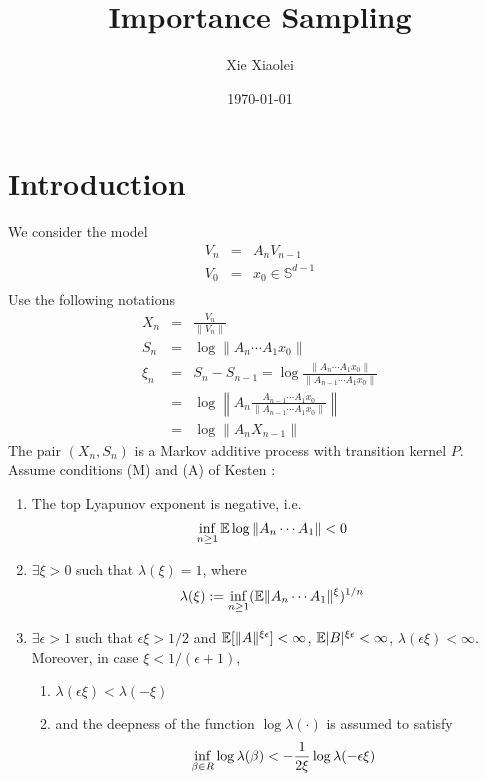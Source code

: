 \documentclass{article}
\title{Importance Sampling}
\author{Xie Xiaolei}
\date{\today}
\begin{document}
\maketitle
\section{Introduction}
We consider the model
\begin{eqnarray*}
V_n &=& A_n V_{n-1} \\
V_0 &=& x_0 \in \mathbb S^{d-1}\\
\end{eqnarray*}
Use the following notations
\begin{eqnarray*}
X_n &=& \frac{V_n}{\|V_n\|} \\
S_n &=& \log \|A_n \cdots A_1 x_0\| \\
\xi_n &=& S_n - S_{n-1} = \log\frac{\|A_n \cdots A_1 x_0\|}{\|A_{n-1}
  \cdots A_1 x_0\|} \\
&=& \log\left\| A_n \frac{A_{n-1} \cdots A_1 x_0}{\|A_{n-1} \cdots A_1
    x_0\|} \right\|\\
&=& \log \|A_n X_{n-1}\|
\end{eqnarray*}
The pair $(X_n, S_n)$ is a Markov additive process with transition
kernel $P$. Assume conditions (M) and (A) of Kesten \cite{Kesten1973}:
\begin{enumerate}
\item The top Lyapunov exponent is negative, i.e.
  \begin{equation}
    \label{eq:neg_top_Lyapunov}
    \inf_{n \geq 1} \mathbb{E} \log \|A_n \cdots A_1\| < 0    
  \end{equation}
\item $\exists \xi > 0$ such that $\lambda(\xi) = 1$, where
  $$
  \lambda(\xi) := \inf_{n \geq 1} (\mathbb{E} \|A_n \cdots A_1\|^\xi)^{1/n}
  $$
\item $\exists \epsilon > 1$ such that $\epsilon \xi > 1/2$ and
  $\mathbb{E}[\|A\|^{\xi\epsilon}] < \infty$, $\mathbb{E} |B|^{\xi \epsilon} <
  \infty$, $\lambda(\epsilon \xi) < \infty$. Moreover, in case $\xi <
  1/(\epsilon + 1)$,
  \begin{enumerate}
  \item $\lambda(\epsilon \xi) < \lambda(-\xi)$
  \item and the deepness of the function $\log \lambda(\cdot)$ is
    assumed to satisfy
    \begin{equation}
      \label{eq:deepness}
      \inf_{\beta \in R} \log \lambda(\beta) < - {1 \over 2\xi} \log
      \lambda(-\epsilon \xi)
    \end{equation}
  \end{enumerate}
\end{enumerate}
\end{document}
